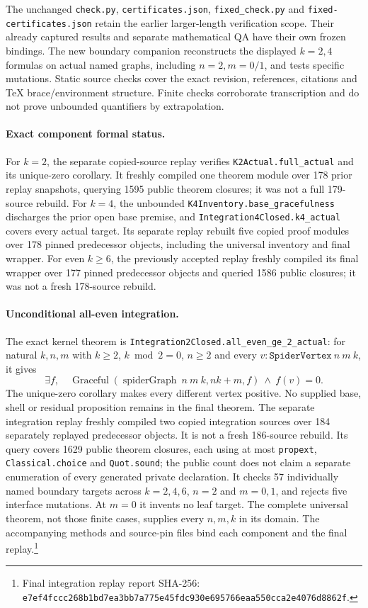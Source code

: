 \documentclass[11pt,a4paper]{article}
\theoremstyle{definition}\newtheorem{definition}[theorem]{Definition}
\theoremstyle{remark}\newtheorem{remark}[theorem]{Remark}
\begin{document}
The unchanged \texttt{check.py}, \texttt{certificates.json},
\texttt{fixed\_check.py} and \texttt{fixed-certificates.json}
retain the earlier larger-length verification scope. Their already
captured results and separate mathematical QA have their own frozen
bindings. The new boundary companion reconstructs the displayed
$k=2,4$ formulas on actual named graphs, including $n=2,m=0/1$,
and tests specific mutations. Static source checks cover the exact
revision, references, citations and TeX brace/environment structure.
Finite checks corroborate transcription and do not prove unbounded
quantifiers by extrapolation.

\paragraph{Exact component formal status.}
For $k=2$, the separate copied-source replay verifies
\texttt{K2Actual.full\_actual} and its unique-zero corollary.
It freshly compiled one theorem module over 178 prior replay snapshots,
querying 1595 public theorem closures; it was not a full 179-source rebuild.
For $k=4$, the unbounded \texttt{K4Inventory.base\_gracefulness}
discharges the prior open base premise, and
\texttt{Integration4Closed.k4\_actual} covers every actual target.
Its separate replay rebuilt five copied proof modules over 178 pinned
predecessor objects, including the universal inventory and final wrapper.
For even $k\ge6$, the previously accepted replay freshly compiled its
final wrapper over 177 pinned predecessor objects and queried 1586 public
closures; it was not a fresh 178-source rebuild.

\paragraph{Unconditional all-even integration.}
The exact kernel theorem is
\texttt{Integration2Closed.all\_even\_ge\_2\_actual}:
for natural $k,n,m$ with $k\ge2$, $k\bmod2=0$, $n\ge2$ and
every $v:\texttt{SpiderVertex}\ n\ m\ k$, it gives
\[
 \exists f,\quad
 \operatorname{Graceful}(\operatorname{spiderGraph}\ n\ m\ k,
                         nk+m,f)\ \wedge\ f(v)=0.
\]
The unique-zero corollary makes every different vertex positive.
No supplied base, shell or residual proposition remains in the final
theorem. The separate integration replay freshly compiled two copied
integration sources over 184 separately replayed predecessor objects.
It is not a fresh 186-source rebuild. Its query covers 1629 public
theorem closures, each using at most \texttt{propext},
\texttt{Classical.choice} and \texttt{Quot.sound}; the public count
does not claim a separate enumeration of every generated private
declaration. It checks 57 individually named boundary targets across
$k=2,4,6$, $n=2$ and $m=0,1$, and rejects five interface mutations.
At $m=0$ it invents no leaf target. The complete universal theorem,
not those finite cases, supplies every $n,m,k$ in its domain.
The accompanying methods and source-pin files bind each component and the
final replay.\footnote{Final integration replay report SHA-256:
\texttt{e7ef4fccc268b1bd7ea3bb7a775e45fdc930e695766eaa550cca2e4076d8862f}.}
\end{document}
